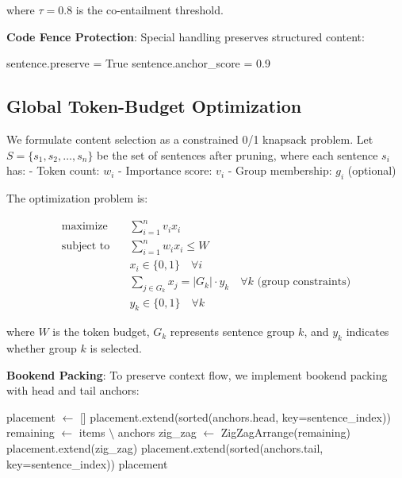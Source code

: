 \documentclass[conference]{IEEEtran}
\begin{document}
where $\tau = 0.8$ is the co-entailment threshold.

\textbf{Code Fence Protection}: Special handling preserves structured content:

\begin{algorithmic}[1]
            \State sentence.preserve = True
            \State sentence.anchor\_score = 0.9
        \EndIf
    \EndFor
\EndProcedure
\end{algorithmic}

\subsection{Global Token-Budget Optimization}

We formulate content selection as a constrained 0/1 knapsack problem. Let $S = \{s_1, s_2, \ldots, s_n\}$ be the set of sentences after pruning, where each sentence $s_i$ has:
- Token count: $w_i$  
- Importance score: $v_i$
- Group membership: $g_i$ (optional)

The optimization problem is:

\begin{align}
\text{maximize} \quad & \sum_{i=1}^{n} v_i x_i \\
\text{subject to} \quad & \sum_{i=1}^{n} w_i x_i \leq W \\
& x_i \in \{0, 1\} \quad \forall i \\
& \sum_{j \in G_k} x_j = |G_k| \cdot y_k \quad \forall k \text{ (group constraints)} \\
& y_k \in \{0, 1\} \quad \forall k
\end{align}

where $W$ is the token budget, $G_k$ represents sentence group $k$, and $y_k$ indicates whether group $k$ is selected.

\textbf{Bookend Packing}: To preserve context flow, we implement bookend packing with head and tail anchors:

\begin{algorithmic}[1]
    \State placement $\leftarrow$ []
    \State placement.extend(sorted(anchors.head, key=sentence\_index))
    \State remaining $\leftarrow$ items $\setminus$ anchors
    \State zig\_zag $\leftarrow$ ZigZagArrange(remaining)
    \State placement.extend(zig\_zag)
    \State placement.extend(sorted(anchors.tail, key=sentence\_index))
    \State \Return placement
\EndProcedure
\end{algorithmic}
\end{document}
